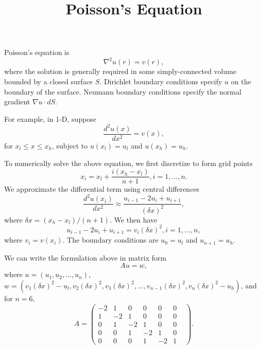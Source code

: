 \documentclass{article}
\title{\sc Poisson's Equation}
\date{}
\begin{document}
\maketitle

Poisson's equation is
\begin{equation}
  \nabla^2 u(r) = v(r),
\end{equation}
where the solution is generally required in some simply-connected volume bounded by a closed surface $S$.  Dirichlet boundary conditions specify $u$ on the boundary of the surface.  Neumann boundary conditions specify the normal gradient $\nabla u \cdot dS$.

For example, in 1-D, suppose
\begin{equation}
  \frac{d^2u(x)}{dx^2} = v(x),
\end{equation}
for $x_l \le x \le x_h$, subject to $u(x_l)=u_l$ and $u(x_h)=u_h$.

To numerically solve the above equation, we first discretize to form grid points
\begin{equation}
  x_i = x_l + \frac{i(x_h-x_l)}{n+1}, i=1,...,n.
\end{equation}
We approximate the differential term using central differences
\begin{equation}
  \frac{d^2u(x_i)}{dx^2} \approx \frac{u_{i-1}-2u_i+u_{i+1}}{(\delta x)^2},
\end{equation}
where $\delta x = (x_h-x_l)/(n+1)$.  We then have
\begin{equation}
  u_{i-1}-2u_i+u_{i+1} = v_i (\delta x)^2, i=1,...,n,
\end{equation}
where $v_i=v(x_i)$.  The boundary conditions are $u_0=u_l$ and $u_{n+1}=u_h$.

We can write the formulation above in matrix form
\begin{equation}
  Au = w,
\end{equation}
where $u=(u_1,u_2,...,u_n)$, $w=(v_1(\delta x)^2-u_l,v_2(\delta x)^2,v_3(\delta x)^2,...,v_{n-1}(\delta x)^2,v_n(\delta x)^2-u_h)$, and for $n=6$,
\begin{equation}
  A =
\begin{pmatrix}
-2&1&0&0&0&0\\
1&-2&1&0&0&0\\
0&1&-2&1&0&0\\
0&0&1&-2&1&0&\\
0&0&0&1&-2&1
\end{pmatrix}.
\end{equation}
\end{document}
